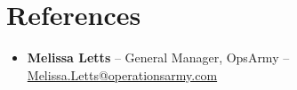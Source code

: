 \documentclass[11pt,a4paper,sans]{moderncv}
\begin{document}

\section{References}
\vspace{1pt}
\begin{itemize}
\item{\textbf{Melissa Letts} -- General Manager, OpsArmy -- \href{mailto:Melissa.Letts@operationsarmy.com}{Melissa.Letts@operationsarmy.com}}
\end{itemize}
\end{document}
